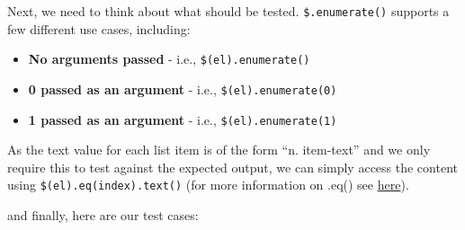 \documentclass[9pt]{book}
\begin{document}
Next, we need to think about what should be tested.
\texttt{\$.enumerate()} supports a few different use cases, including:

\begin{itemize}
\itemsep1pt\parskip0pt
\item
  \textbf{No arguments passed} - i.e., \texttt{\$(el).enumerate()}
\item
  \textbf{0 passed as an argument} - i.e., \texttt{\$(el).enumerate(0)}
\item
  \textbf{1 passed as an argument} - i.e., \texttt{\$(el).enumerate(1)}
\end{itemize}

As the text value for each list item is of the form ``n. item-text'' and
we only require this to test against the expected output, we can simply
access the content using \texttt{\$(el).eq(index).text()} (for more
information on .eq() see \href{http://api.jquery.com/eq/}{here}).

and finally, here are our test cases:
\end{document}

